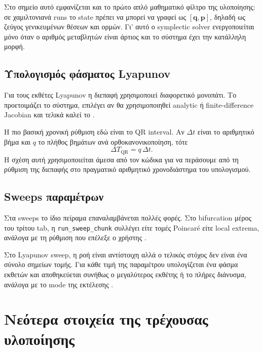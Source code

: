 Στο σημείο αυτό εμφανίζεται και το πρώτο απλό μαθηματικό φίλτρο της
υλοποίησης: σε χαμιλτονιανά runs το state πρέπει να μπορεί να γραφεί ως
\([\mathbf{q},\mathbf{p}]\), δηλαδή ως ζεύγος γενικευμένων θέσεων και ορμών.
Γι' αυτό ο symplectic solver ενεργοποιείται μόνο όταν ο αριθμός μεταβλητών
είναι άρτιος και το σύστημα έχει την κατάλληλη μορφή.

\subsection{Υπολογισμός φάσματος Lyapunov}
\label{subsec:ch2-lyapunov-path}

Για τους εκθέτες Lyapunov η διεπαφή χρησιμοποιεί διαφορετικό μονοπάτι. Το
 προετοιμάζει το σύστημα, επιλέγει αν θα
χρησιμοποιηθεί analytic ή finite-difference Jacobian και τελικά καλεί το
 \cite{nlds_src_logic_lyapunov_cached,nlds_src_core_lyapunov}.

Η πιο βασική χρονική ρύθμιση εδώ είναι το QR interval. Αν \(\Delta t\) είναι
το αριθμητικό βήμα και \(q\) το πλήθος βημάτων ανά ορθοκανονικοποίηση, τότε
\begin{equation}
\Delta T_{\mathrm{QR}} = q\,\Delta t.
\end{equation}
Η σχέση αυτή χρησιμοποιείται άμεσα από τον κώδικα για να περάσουμε από τη
ρύθμιση της διεπαφής στο πραγματικό αριθμητικό χρονοδιάστημα του υπολογισμού.

\subsection{Sweeps παραμέτρων}
\label{subsec:ch2-sweep-path}

Στα sweeps το ίδιο πείραμα επαναλαμβάνεται πολλές φορές. Στο bifurcation μέρος
του τρίτου tab, η \texttt{run\_sweep\_chunk} συλλέγει είτε τομές Poincar\'e
είτε local extrema, ανάλογα με τη ρύθμιση που επέλεξε ο χρήστης
\cite{nlds_src_ui_bifurcation_tab,nlds_src_app_sweep,nlds_src_core_poincare}.

Στο Lyapunov sweep, η ροή είναι αντίστοιχη αλλά ο τελικός στόχος δεν είναι ένα
σύνολο σημείων τομής. Για κάθε τιμή της παραμέτρου υπολογίζεται ένα φάσμα
εκθετών και αποθηκεύεται συνήθως ο μεγαλύτερος εκθέτης ή το πλήρες διάνυσμα,
ανάλογα με το mode της εκτέλεσης
\cite{nlds_src_logic_lyapunov_sweep,nlds_src_core_lyapunov}.

\section{Νεότερα στοιχεία της τρέχουσας υλοποίησης}
\label{sec:ch2-current-implementation}


